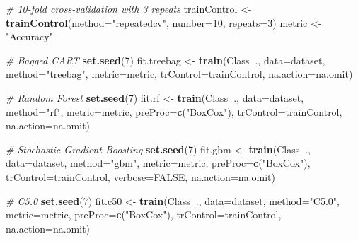 \documentclass[]{book}
\newenvironment{Shaded}{\begin{snugshade}}{\end{snugshade}}
\newcommand{\CommentTok}[1]{\textcolor[rgb]{0.56,0.35,0.01}{\textit{#1}}}
\newcommand{\DataTypeTok}[1]{\textcolor[rgb]{0.13,0.29,0.53}{#1}}
\newcommand{\DecValTok}[1]{\textcolor[rgb]{0.00,0.00,0.81}{#1}}
\newcommand{\KeywordTok}[1]{\textcolor[rgb]{0.13,0.29,0.53}{\textbf{#1}}}
\newcommand{\NormalTok}[1]{#1}
\newcommand{\OperatorTok}[1]{\textcolor[rgb]{0.81,0.36,0.00}{\textbf{#1}}}
\newcommand{\OtherTok}[1]{\textcolor[rgb]{0.56,0.35,0.01}{#1}}
\newcommand{\StringTok}[1]{\textcolor[rgb]{0.31,0.60,0.02}{#1}}
\begin{document}
\begin{Shaded}
\begin{Highlighting}[]
\CommentTok{# 10-fold cross-validation with 3 repeats}
\NormalTok{trainControl <-}\StringTok{ }\KeywordTok{trainControl}\NormalTok{(}\DataTypeTok{method=}\StringTok{"repeatedcv"}\NormalTok{, }\DataTypeTok{number=}\DecValTok{10}\NormalTok{, }\DataTypeTok{repeats=}\DecValTok{3}\NormalTok{)}
\NormalTok{metric <-}\StringTok{ "Accuracy"}

\CommentTok{# Bagged CART}
\KeywordTok{set.seed}\NormalTok{(}\DecValTok{7}\NormalTok{)}
\NormalTok{fit.treebag <-}\StringTok{ }\KeywordTok{train}\NormalTok{(Class}\OperatorTok{~}\NormalTok{., }\DataTypeTok{data=}\NormalTok{dataset, }\DataTypeTok{method=}\StringTok{"treebag"}\NormalTok{, }\DataTypeTok{metric=}\NormalTok{metric, }
                     \DataTypeTok{trControl=}\NormalTok{trainControl, }\DataTypeTok{na.action=}\NormalTok{na.omit)}

\CommentTok{# Random Forest}
\KeywordTok{set.seed}\NormalTok{(}\DecValTok{7}\NormalTok{)}
\NormalTok{fit.rf <-}\StringTok{ }\KeywordTok{train}\NormalTok{(Class}\OperatorTok{~}\NormalTok{., }\DataTypeTok{data=}\NormalTok{dataset, }\DataTypeTok{method=}\StringTok{"rf"}\NormalTok{, }\DataTypeTok{metric=}\NormalTok{metric, }
                \DataTypeTok{preProc=}\KeywordTok{c}\NormalTok{(}\StringTok{"BoxCox"}\NormalTok{), }\DataTypeTok{trControl=}\NormalTok{trainControl, }\DataTypeTok{na.action=}\NormalTok{na.omit)}

\CommentTok{# Stochastic Gradient Boosting}
\KeywordTok{set.seed}\NormalTok{(}\DecValTok{7}\NormalTok{)}
\NormalTok{fit.gbm <-}\StringTok{ }\KeywordTok{train}\NormalTok{(Class}\OperatorTok{~}\NormalTok{., }\DataTypeTok{data=}\NormalTok{dataset, }\DataTypeTok{method=}\StringTok{"gbm"}\NormalTok{, }\DataTypeTok{metric=}\NormalTok{metric, }
                 \DataTypeTok{preProc=}\KeywordTok{c}\NormalTok{(}\StringTok{"BoxCox"}\NormalTok{), }\DataTypeTok{trControl=}\NormalTok{trainControl, }\DataTypeTok{verbose=}\OtherTok{FALSE}\NormalTok{, }\DataTypeTok{na.action=}\NormalTok{na.omit)}

\CommentTok{# C5.0}
\KeywordTok{set.seed}\NormalTok{(}\DecValTok{7}\NormalTok{)}
\NormalTok{fit.c50 <-}\StringTok{ }\KeywordTok{train}\NormalTok{(Class}\OperatorTok{~}\NormalTok{., }\DataTypeTok{data=}\NormalTok{dataset, }\DataTypeTok{method=}\StringTok{"C5.0"}\NormalTok{, }\DataTypeTok{metric=}\NormalTok{metric, }
                 \DataTypeTok{preProc=}\KeywordTok{c}\NormalTok{(}\StringTok{"BoxCox"}\NormalTok{), }\DataTypeTok{trControl=}\NormalTok{trainControl, }\DataTypeTok{na.action=}\NormalTok{na.omit)}


\end{Highlighting}
\end{Shaded}
\end{document}
